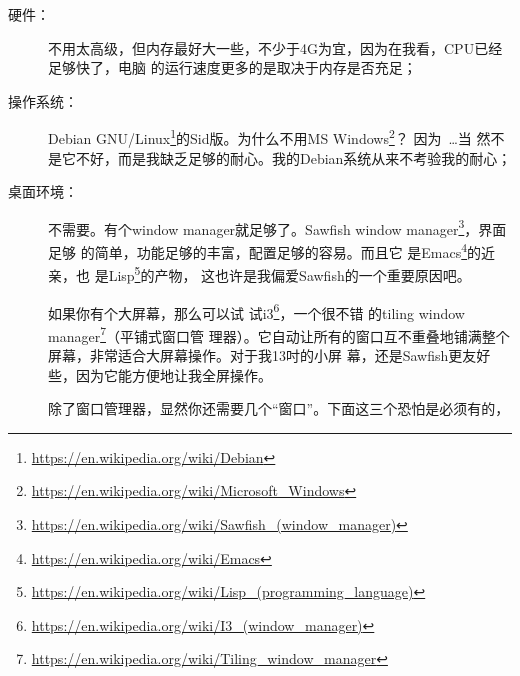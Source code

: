 \begin{description}
\item[硬件：]不用太高级，但内存最好大一些，不少于4G为宜，因为在我看，CPU已经足够快了，电脑
  的运行速度更多的是取决于内存是否充足；
\item[操作系统：]Debian
  GNU/Linux\footnote{\url{https://en.wikipedia.org/wiki/Debian}}的Sid版。为什么不用MS
  Windows\footnote{\url{https://en.wikipedia.org/wiki/Microsoft_Windows}}？ 因为~\ldots 当
  然不是它不好，而是我缺乏足够的耐心。我的Debian系统从来不考验我的耐心；
\item[桌面环境：]不需要。有个window manager就足够了。Sawfish window
  manager\footnote{\url{https://en.wikipedia.org/wiki/Sawfish_(window_manager)}}，界面足够
  的简单，功能足够的丰富，配置足够的容易。而且它
  是Emacs\footnote{\url{https://en.wikipedia.org/wiki/Emacs}}的近亲，也
  是Lisp\footnote{\url{https://en.wikipedia.org/wiki/Lisp_(programming_language)}}的产物，
  这也许是我偏爱Sawfish的一个重要原因吧。

  如果你有个大屏幕，那么可以试
  试i3\footnote{\url{https://en.wikipedia.org/wiki/I3_(window_manager)}}，一个很不错
  的tiling window
  manager\footnote{\url{https://en.wikipedia.org/wiki/Tiling_window_manager}}（平铺式窗口管
  理器）。它自动让所有的窗口互不重叠地铺满整个屏幕，非常适合大屏幕操作。对于我13吋的小屏
  幕，还是Sawfish更友好些，因为它能方便地让我全屏操作。

  除了窗口管理器，显然你还需要几个“窗口”。下面这三个恐怕是必须有的，


\end{description}

